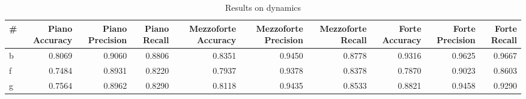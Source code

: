 \begin{table}
\centering
\caption{Results on dynamics}
\label{tb:dynsol}
\begin{tabular}{lrrrrrrrrr}
\toprule
 \# &  Piano Accuracy &  Piano Precision &  Piano Recall &  Mezzoforte Accuracy &  Mezzoforte  Precision &  Mezzoforte Recall &  Forte Accuracy &  Forte Precision &  Forte Recall \\
\midrule
 b &          0.8069 &           0.9060 &        0.8806 &               0.8351 &                 0.9450 &             0.8778 &          0.9316 &           0.9625 &        0.9667 \\
 f &          0.7484 &           0.8931 &        0.8220 &               0.7937 &                 0.9378 &             0.8378 &          0.7870 &           0.9023 &        0.8603 \\
 g &          0.7564 &           0.8962 &        0.8290 &               0.8118 &                 0.9435 &             0.8533 &          0.8821 &           0.9458 &        0.9290 \\
\bottomrule
\end{tabular}
\end{table}
